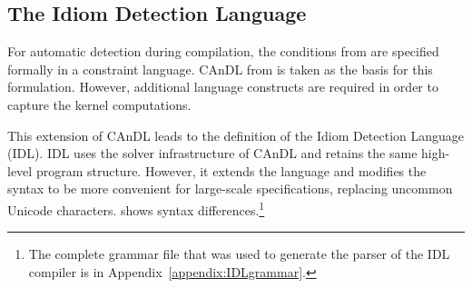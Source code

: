 \subsection{The Idiom Detection Language}
\label{sec:IDLdefinition}

    For automatic detection during compilation, the conditions from
     are specified formally in
    a constraint language.
    CAnDL from  is taken as the basis for this formulation.
    However, additional language constructs are required in order to capture
    the kernel computations.

    This extension of CAnDL leads to the definition of the
    Idiom Detection Language (IDL).
    IDL uses the solver infrastructure of CAnDL and retains the same high-level
    program structure.
    However, it extends the language and modifies the syntax to be more
    convenient for large-scale specifications, replacing uncommon Unicode
    characters.
     shows syntax differences.\footnote{The complete grammar
    file that was used to generate the parser of the IDL compiler is in
    Appendix~\ref{appendix:IDLgrammar}.}

